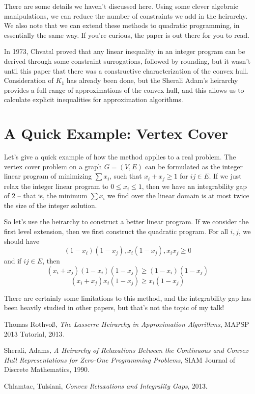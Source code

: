 \documentclass{article}
\theoremstyle{plain}
\theoremstyle{definition}
\begin{document}
There are some details we haven't discussed here. Using some clever algebraic manipulations, we can reduce the number of constraints we add in the heirarchy. We also note that we can extend these methods to quadratic programming, in essentially the same way. If you're curious, the paper is out there for you to read.

In 1973, Chvatal proved that any linear inequality in an integer program can be derived through some constraint surrogations, followed by rounding, but it wasn't until this paper that there was a constructive characterization of the convex hull. Consideration of $K_1$ has already been done, but the Sherali Adam's heirarchy provides a full range of approximations of the convex hull, and this allows us to calculate explicit inequalities for approximation algorithms.

\section{A Quick Example: Vertex Cover}

Let's give a quick example of how the method applies to a real problem. The vertex cover problem on a graph $G = (V,E)$ can be formulated as the integer linear program of minimizing $\sum x_i$, such that $x_i + x_j \geq 1$ for $ij \in E$. If we just relax the integer linear program to $0 \leq x_i \leq 1$, then we have an integrability gap of 2 -- that is, the minimum $\sum x_i$ we find over the linear domain is at most twice the size of the integer solution.

So let's use the heirarchy to construct a better linear program. If we consider the first level extension, then we first construct the quadratic program. For all $i,j$, we should have
%
\[ (1 - x_i)(1 - x_j), x_i(1 - x_j), x_ix_j \geq 0 \]
%
and if $ij \in E$, then
%
\[ (x_i + x_j)(1 - x_i)(1 - x_j) \geq (1 - x_i)(1 - x_j) \]
\[ (x_i + x_j)x_i(1 - x_j) \geq x_i(1 - x_j) \]

There are certainly some limitations to this method, and the integrability gap has been heavily studied in other papers, but that's not the topic of my talk!

\begin{thebibliography}{9}

    Thomas Rothvo\ss,
    \emph{The Lasserre Heirarchy in Approximation Algorithms},
    MAPSP 2013 Tutorial,
    2013.

    Sherali, Adams,
    \emph{A Heirarchy of Relaxations Between the Continuous and Convex Hull Representations for Zero-One Programming Problems},
    SIAM Journal of Discrete Mathematics,
    1990.

    Chlamtac, Tulsiani,
    \emph{Convex Relaxations and Integrality Gaps},
    2013.

\end{thebibliography}
\end{document}
